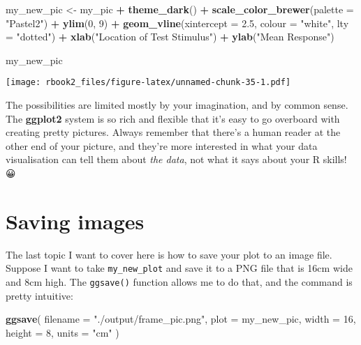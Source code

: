 \documentclass[]{book}
\newenvironment{Shaded}{\begin{snugshade}}{\end{snugshade}}
\newcommand{\DataTypeTok}[1]{\textcolor[rgb]{0.13,0.29,0.53}{#1}}
\newcommand{\DecValTok}[1]{\textcolor[rgb]{0.00,0.00,0.81}{#1}}
\newcommand{\FloatTok}[1]{\textcolor[rgb]{0.00,0.00,0.81}{#1}}
\newcommand{\KeywordTok}[1]{\textcolor[rgb]{0.13,0.29,0.53}{\textbf{#1}}}
\newcommand{\NormalTok}[1]{#1}
\newcommand{\OperatorTok}[1]{\textcolor[rgb]{0.81,0.36,0.00}{\textbf{#1}}}
\newcommand{\StringTok}[1]{\textcolor[rgb]{0.31,0.60,0.02}{#1}}
\begin{document}
\begin{Shaded}
\begin{Highlighting}[]
\NormalTok{my_new_pic <-}\StringTok{ }\NormalTok{my_pic }\OperatorTok{+}\StringTok{ }
\StringTok{  }\KeywordTok{theme_dark}\NormalTok{() }\OperatorTok{+}
\StringTok{  }\KeywordTok{scale_color_brewer}\NormalTok{(}\DataTypeTok{palette =} \StringTok{"Pastel2"}\NormalTok{) }\OperatorTok{+}
\StringTok{  }\KeywordTok{ylim}\NormalTok{(}\DecValTok{0}\NormalTok{, }\DecValTok{9}\NormalTok{) }\OperatorTok{+}\StringTok{ }
\StringTok{  }\KeywordTok{geom_vline}\NormalTok{(}\DataTypeTok{xintercept =} \FloatTok{2.5}\NormalTok{, }\DataTypeTok{colour =} \StringTok{"white"}\NormalTok{, }\DataTypeTok{lty =} \StringTok{"dotted"}\NormalTok{) }\OperatorTok{+}
\StringTok{  }\KeywordTok{xlab}\NormalTok{(}\StringTok{"Location of Test Stimulus"}\NormalTok{) }\OperatorTok{+}
\StringTok{  }\KeywordTok{ylab}\NormalTok{(}\StringTok{"Mean Response"}\NormalTok{)}

\NormalTok{my_new_pic}
\end{Highlighting}
\end{Shaded}

\texttt{[image: rbook2\_files/figure-latex/unnamed-chunk-35-1.pdf]}

The possibilities are limited mostly by your imagination, and by common sense. The \textbf{ggplot2} system is so rich and flexible that it's easy to go overboard with creating pretty pictures. Always remember that there's a human reader at the other end of your picture, and they're more interested in what your data visualisation can tell them about \emph{the data}, not what it says about your R skills! 😀

\hypertarget{saving-images}{%
\section{Saving images}\label{saving-images}}

The last topic I want to cover here is how to save your plot to an image file. Suppose I want to take \texttt{my\_new\_plot} and save it to a PNG file that is 16cm wide and 8cm high. The \texttt{ggsave()} function allows me to do that, and the command is pretty intuitive:

\begin{Shaded}
\begin{Highlighting}[]
\KeywordTok{ggsave}\NormalTok{(}
  \DataTypeTok{filename =} \StringTok{"./output/frame_pic.png"}\NormalTok{,}
  \DataTypeTok{plot =}\NormalTok{ my_new_pic,}
  \DataTypeTok{width =} \DecValTok{16}\NormalTok{,}
  \DataTypeTok{height =} \DecValTok{8}\NormalTok{,}
  \DataTypeTok{units =} \StringTok{"cm"}
\NormalTok{)}
\end{Highlighting}
\end{Shaded}
\end{document}
